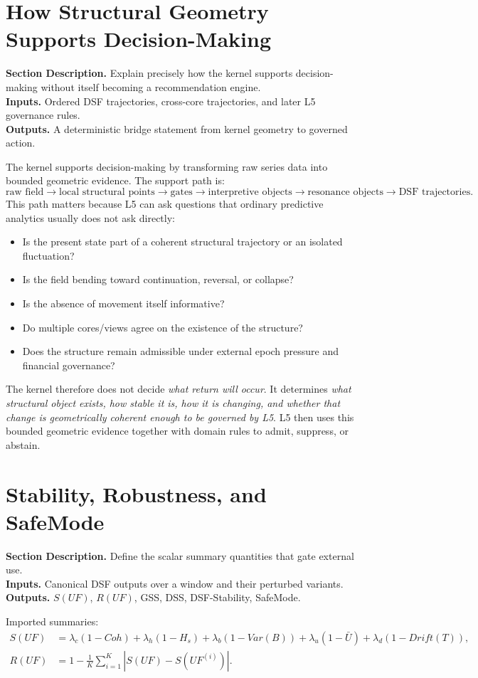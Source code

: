 \documentclass[11pt]{report}
\newcommand{\meta}[3]{\textbf{Section Description.} #1\\
\textbf{Inputs.} #2\\
\textbf{Outputs.} #3\par}
\begin{document}
\section{How Structural Geometry Supports Decision-Making}
\meta{Explain precisely how the kernel supports decision-making without itself becoming a recommendation engine.}{Ordered DSF trajectories, cross-core trajectories, and later L5 governance rules.}{A deterministic bridge statement from kernel geometry to governed action.}

The kernel supports decision-making by transforming raw series data into bounded geometric evidence. The support path is:
\[
\text{raw field} \rightarrow \text{local structural points} \rightarrow \text{gates} \rightarrow \text{interpretive objects} \rightarrow \text{resonance objects} \rightarrow \text{DSF trajectories}.
\]
This path matters because L5 can ask questions that ordinary predictive analytics usually does not ask directly:
\begin{itemize}
    \item Is the present state part of a coherent structural trajectory or an isolated fluctuation?
    \item Is the field bending toward continuation, reversal, or collapse?
    \item Is the absence of movement itself informative?
    \item Do multiple cores/views agree on the existence of the structure?
    \item Does the structure remain admissible under external epoch pressure and financial governance?
\end{itemize}

The kernel therefore does not decide \emph{what return will occur}. It determines \emph{what structural object exists, how stable it is, how it is changing, and whether that change is geometrically coherent enough to be governed by L5}. L5 then uses this bounded geometric evidence together with domain rules to admit, suppress, or abstain.

\section{Stability, Robustness, and SafeMode}
\meta{Define the scalar summary quantities that gate external use.}{Canonical DSF outputs over a window and their perturbed variants.}{$S(UF)$, $R(UF)$, GSS, DSS, DSF-Stability, SafeMode.}

Imported summaries:
\begin{align*}
S(UF) &= \lambda_c(1-Coh)+\lambda_h(1-H_s)+\lambda_b(1-Var(B))+\lambda_u(1-\bar U)+\lambda_d(1-Drift(T)),\\
R(UF) &= 1-\frac{1}{K}\sum_{i=1}^{K}\left|S(UF)-S(UF^{(i)})\right|.
\end{align*}
\end{document}
